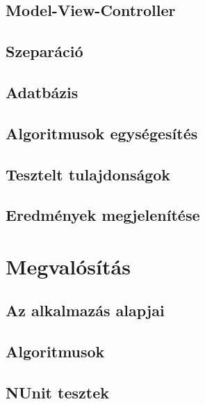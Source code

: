 \documentclass[12pt]{report} %
\begin{document}
\section{Model-View-Controller} %

\section{Szeparáció} %

\section{Adatbázis} %

\section{Algoritmusok egységesítés} %

\section{Tesztelt tulajdonságok} %

\section{Eredmények megjelenítése} %

\chapter{Megvalósítás} %

\section{Az alkalmazás alapjai} %

\section{Algoritmusok} %

\section{NUnit tesztek} %
\end{document}
